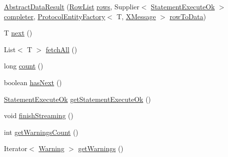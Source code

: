 \begin{DoxyCompactItemize}
\item 
\mbox{\hyperlink{classcom_1_1mysql_1_1cj_1_1xdevapi_1_1_abstract_data_result_a662bf16eb25a6e01e053580bc63f020d}{Abstract\+Data\+Result}} (\mbox{\hyperlink{interfacecom_1_1mysql_1_1cj_1_1result_1_1_row_list}{Row\+List}} \mbox{\hyperlink{classcom_1_1mysql_1_1cj_1_1xdevapi_1_1_abstract_data_result_ae04b2bf0af10423f89abe996549946f9}{rows}}, Supplier$<$ \mbox{\hyperlink{classcom_1_1mysql_1_1cj_1_1protocol_1_1x_1_1_statement_execute_ok}{Statement\+Execute\+Ok}} $>$ \mbox{\hyperlink{classcom_1_1mysql_1_1cj_1_1xdevapi_1_1_abstract_data_result_aec36caa2d5404a5748add97ebab8bc1e}{completer}}, \mbox{\hyperlink{interfacecom_1_1mysql_1_1cj_1_1protocol_1_1_protocol_entity_factory}{Protocol\+Entity\+Factory}}$<$ T, \mbox{\hyperlink{classcom_1_1mysql_1_1cj_1_1protocol_1_1x_1_1_x_message}{X\+Message}} $>$ \mbox{\hyperlink{classcom_1_1mysql_1_1cj_1_1xdevapi_1_1_abstract_data_result_a05558a272c6983191c011faaf3de89ad}{row\+To\+Data}})
\item 
T \mbox{\hyperlink{classcom_1_1mysql_1_1cj_1_1xdevapi_1_1_abstract_data_result_a275a94d6439506bd062c6c38e911283c}{next}} ()
\item 
List$<$ T $>$ \mbox{\hyperlink{classcom_1_1mysql_1_1cj_1_1xdevapi_1_1_abstract_data_result_aa0376cefb0ca352d431b392149481588}{fetch\+All}} ()
\item 
long \mbox{\hyperlink{classcom_1_1mysql_1_1cj_1_1xdevapi_1_1_abstract_data_result_a7825d8f19a7fd60da5c89755219a22d2}{count}} ()
\item 
boolean \mbox{\hyperlink{classcom_1_1mysql_1_1cj_1_1xdevapi_1_1_abstract_data_result_af873fff3d2449cd6a1f189be25d58ec6}{has\+Next}} ()
\item 
\mbox{\hyperlink{classcom_1_1mysql_1_1cj_1_1protocol_1_1x_1_1_statement_execute_ok}{Statement\+Execute\+Ok}} \mbox{\hyperlink{classcom_1_1mysql_1_1cj_1_1xdevapi_1_1_abstract_data_result_ab2e2a86090761e83b3198b2581a31d69}{get\+Statement\+Execute\+Ok}} ()
\item 
void \mbox{\hyperlink{classcom_1_1mysql_1_1cj_1_1xdevapi_1_1_abstract_data_result_a6a37bb1022bc6bea43edf1f996dca4d4}{finish\+Streaming}} ()
\item 
int \mbox{\hyperlink{classcom_1_1mysql_1_1cj_1_1xdevapi_1_1_abstract_data_result_aa3c13a06303670b7e9720befa3daf72b}{get\+Warnings\+Count}} ()
\item 
Iterator$<$ \mbox{\hyperlink{interfacecom_1_1mysql_1_1cj_1_1protocol_1_1_warning}{Warning}} $>$ \mbox{\hyperlink{classcom_1_1mysql_1_1cj_1_1xdevapi_1_1_abstract_data_result_ac75c20b55a1923cac43c52ca6df9bdca}{get\+Warnings}} ()
\end{DoxyCompactItemize}
